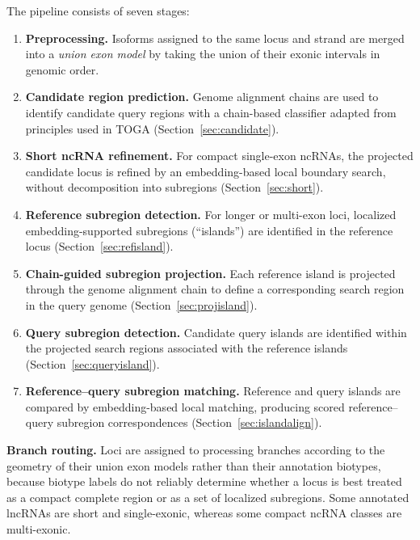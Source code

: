The pipeline consists of seven stages:
\begin{enumerate}
    \item \textbf{Preprocessing.} Isoforms assigned to the same locus and strand are
    merged into a \emph{union exon model} by taking the union of their exonic
    intervals in genomic order.

    \item \textbf{Candidate region prediction.} Genome alignment chains are used to
    identify candidate query regions with a chain-based classifier adapted from
    principles used in TOGA
    (Section~\ref{sec:candidate}).

    \item \textbf{Short ncRNA refinement.} For compact single-exon ncRNAs, the
    projected candidate locus is refined by an embedding-based local boundary
    search, without decomposition into subregions
    (Section~\ref{sec:short}).

    \item \textbf{Reference subregion detection.} For longer or multi-exon loci,
    localized embedding-supported subregions (``islands'') are identified in the
    reference locus
    (Section~\ref{sec:refisland}).

    \item \textbf{Chain-guided subregion projection.} Each reference island is
    projected through the genome alignment chain to define a corresponding search
    region in the query genome
    (Section~\ref{sec:projisland}).

    \item \textbf{Query subregion detection.} Candidate query islands are identified
    within the projected search regions associated with the reference islands
    (Section~\ref{sec:queryisland}).

    \item \textbf{Reference--query subregion matching.} Reference and query islands
    are compared by embedding-based local matching, producing scored
    reference--query subregion correspondences
    (Section~\ref{sec:islandalign}).
\end{enumerate}

\textbf{Branch routing.} Loci are assigned to processing branches according to
the geometry of their union exon models rather than their annotation biotypes,
because biotype labels do not reliably determine whether a locus is best treated
as a compact complete region or as a set of localized subregions. Some annotated
lncRNAs are short and single-exonic, whereas some compact ncRNA classes are
multi-exonic.

